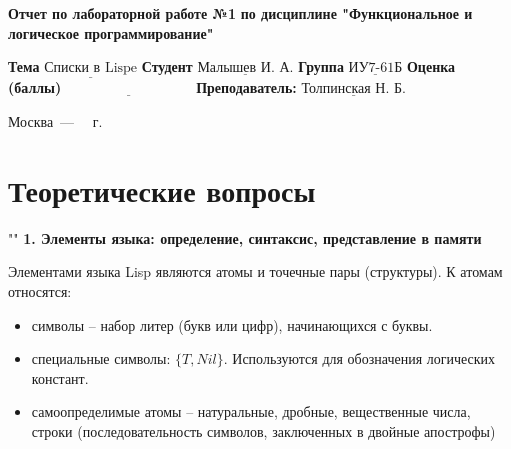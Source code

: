 \documentclass[12pt]{report}
\begin{document}
\begin{titlepage}
	
	\begin{center}
		\noindent\begin{minipage}{1.3\textwidth}\centering
			\Large\textbf{  Отчет по лабораторной работе №1}\newline
			\textbf{по дисциплине \newline "Функциональное и логическое программирование"}\newline\newline
		\end{minipage}
	\end{center}
	
	\noindent\textbf{Тема} $\underline{\text{Списки в Lispe}}$\newline\newline
	\noindent\textbf{Студент} $\underline{\text{Малышев И. А.}}$\newline\newline
	\noindent\textbf{Группа} $\underline{\text{ИУ7-61Б}}$\newline\newline
	\noindent\textbf{Оценка (баллы)} $\underline{\text{~~~~~~~~~~~~~~~~~~~~~~~~~~~}}$\newline\newline
	\noindent\textbf{Преподаватель: } $\underline{\text{Толпинская Н. Б.}}$\newline\newline\newline
	
	\begin{center}
		\vfill
		Москва~---~\the\year
		~г.
	\end{center}
\end{titlepage}


\setcounter{page}{2}
\chapter*{Теоретические вопросы}
""\newline
\textbf{1. Элементы языка: определение, синтаксис, представление в памяти}

Элементами языка Lisp являются атомы и точечные пары (структуры). К атомам относятся:

\begin{itemize}
	\item символы -- набор литер (букв или цифр), начинающихся с буквы.
	\item специальные символы: $\{T, Nil\}$. Используются для обозначения логических констант.
	\item самоопределимые атомы -- натуральные, дробные, вещественные числа, строки (последовательность символов, заключенных в двойные апострофы)
\end{itemize}
\end{document}
